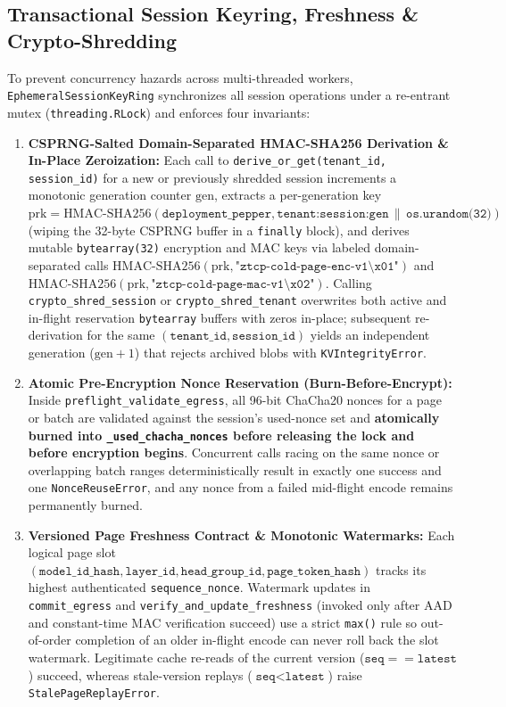 \documentclass[10pt,twocolumn]{article}
\begin{document}
\subsection{Transactional Session Keyring, Freshness \& Crypto-Shredding}
To prevent concurrency hazards across multi-threaded workers, \texttt{EphemeralSessionKeyRing} synchronizes all session operations under a re-entrant mutex (\texttt{threading.RLock}) and enforces four invariants:
\begin{enumerate}
    \item \textbf{CSPRNG-Salted Domain-Separated HMAC-SHA256 Derivation \& In-Place Zeroization:} Each call to \texttt{derive\_or\_get(tenant\_id, session\_id)} for a new or previously shredded session increments a monotonic generation counter $\text{gen}$, extracts a per-generation key $\text{prk} = \text{HMAC-SHA256}(\texttt{deployment\_pepper},\allowbreak \texttt{tenant:session:gen} \,\|\, \texttt{os.urandom(32)})$ (wiping the 32-byte CSPRNG buffer in a \texttt{finally} block), and derives mutable \texttt{bytearray(32)} encryption and MAC keys via labeled domain-separated calls $\text{HMAC-SHA256}(\text{prk},\allowbreak \texttt{"ztcp-cold-page-enc-v1\textbackslash x01"})$ and $\text{HMAC-SHA256}(\text{prk},\allowbreak \texttt{"ztcp-cold-page-mac-v1\textbackslash x02"})$. Calling \texttt{crypto\_shred\_session} or \texttt{crypto\_shred\_tenant} overwrites both active and in-flight reservation \texttt{bytearray} buffers with zeros in-place; subsequent re-derivation for the same $(\texttt{tenant\_id}, \texttt{session\_id})$ yields an independent generation ($\text{gen}+1$) that rejects archived blobs with \texttt{KVIntegrityError}.
    \item \textbf{Atomic Pre-Encryption Nonce Reservation (Burn-Before-Encrypt):} Inside \texttt{preflight\_validate\_egress}, all 96-bit ChaCha20 nonces for a page or batch are validated against the session's used-nonce set and \textbf{atomically burned into \texttt{\_used\_chacha\_nonces} before releasing the lock and before encryption begins}. Concurrent calls racing on the same nonce or overlapping batch ranges deterministically result in exactly one success and one \texttt{NonceReuseError}, and any nonce from a failed mid-flight encode remains permanently burned.
    \item \textbf{Versioned Page Freshness Contract \& Monotonic Watermarks:} Each logical page slot $(\texttt{model\_id\_hash},\allowbreak \texttt{layer\_id},\allowbreak \texttt{head\_group\_id},\allowbreak \texttt{page\_token\_hash})$ tracks its highest authenticated \texttt{sequence\_\allowbreak nonce}. Watermark updates in \texttt{commit\_\allowbreak egress} and \texttt{verify\_\allowbreak and\_\allowbreak update\_\allowbreak freshness} (invoked only after AAD and constant-time MAC verification succeed) use a strict \texttt{max()} rule so out-of-order completion of an older in-flight encode can never roll back the slot watermark. Legitimate cache re-reads of the current version ($\texttt{seq} == \texttt{latest}$) succeed, whereas stale-version replays ($\texttt{seq} < \texttt{latest}$) raise \texttt{Stale\allowbreak Page\allowbreak Replay\allowbreak Error}.

\end{enumerate}
\end{document}
